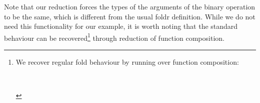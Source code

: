 Note that our reduction forces the types of the arguments of the binary
operation to be the same, which is different from the usual foldr definition.
While we do not need this functionality for our example,
it is worth noting that the standard behaviour can be recovered\footnote{
We recover regular fold behaviour by running  over function composition:
\begin{code}%
%
\>[2]\AgdaSpace{}%
\AgdaSymbol{:}\AgdaSpace{}%
\AgdaSymbol{(}\AgdaSpace{}%
\AgdaSpace{}%
\AgdaSpace{}%
\AgdaSpace{}%
\AgdaSymbol{)}\AgdaSpace{}%
\AgdaSpace{}%
\AgdaSpace{}%
\AgdaSpace{}%
\AgdaSpace{}%
\AgdaSpace{}%
\AgdaSpace{}%
\AgdaSpace{}%
\<%
\\
%
\>[2]\AgdaSpace{}%
\AgdaSpace{}%
\AgdaSpace{}%
\AgdaSpace{}%
\AgdaSymbol{=}\AgdaSpace{}%
\AgdaSpace{}%
\AgdaSpace{}%
\AgdaSpace{}%
\AgdaSymbol{(}\AgdaSpace{}%
\AgdaSpace{}%
\AgdaSymbol{)}\AgdaSpace{}%
\<%
\end{code}
} through reduction of function composition.

